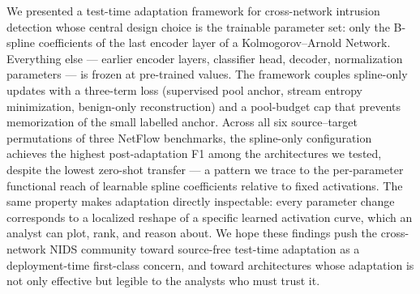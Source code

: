 \documentclass[10pt, conference, letterpaper]{IEEEtran}
\begin{document}
We presented a test-time adaptation framework for cross-network intrusion detection whose central design choice is the trainable parameter set: only the B-spline coefficients of the last encoder layer of a Kolmogorov--Arnold Network. Everything else --- earlier encoder layers, classifier head, decoder, normalization parameters --- is frozen at pre-trained values. The framework couples spline-only updates with a three-term loss (supervised pool anchor, stream entropy minimization, benign-only reconstruction) and a pool-budget cap that prevents memorization of the small labelled anchor. Across all six source--target permutations of three NetFlow benchmarks, the spline-only configuration achieves the highest post-adaptation F1 among the architectures we tested, despite the lowest zero-shot transfer --- a pattern we trace to the per-parameter functional reach of learnable spline coefficients relative to fixed activations. The same property makes adaptation directly inspectable: every parameter change corresponds to a localized reshape of a specific learned activation curve, which an analyst can plot, rank, and reason about. We hope these findings push the cross-network NIDS community toward source-free test-time adaptation as a deployment-time first-class concern, and toward architectures whose adaptation is not only effective but legible to the analysts who must trust it.



\end{document}
